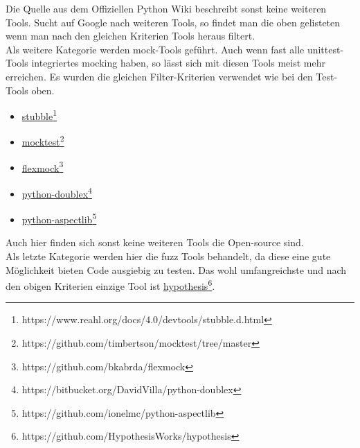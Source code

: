 Die Quelle aus dem Offiziellen Python Wiki beschreibt sonst keine weiteren Tools.
Sucht auf Google nach weiteren Tools, so findet man die oben gelisteten wenn man
nach den gleichen Kriterien Tools heraus filtert.
\newline
\\
Als weitere Kategorie werden \Gls{mock}-Tools geführt. Auch wenn fast alle
unittest-Tools integriertes \gls{mock}ing haben, so lässt sich mit diesen
Tools meist mehr erreichen. Es wurden die gleichen Filter-Kriterien verwendet wie bei den
Test-Tools oben.
\begin{itemize}
    \item \href{https://www.reahl.org/docs/4.0/devtools/stubble.d.html}{stubble}\footnote{https://www.reahl.org/docs/4.0/devtools/stubble.d.html}
    \item \href{https://github.com/timbertson/mocktest/tree/master}{mocktest}\footnote{https://github.com/timbertson/mocktest/tree/master}
    \item \href{https://github.com/bkabrda/flexmock}{flexmock}\footnote{https://github.com/bkabrda/flexmock}
    \item \href{https://bitbucket.org/DavidVilla/python-doublex}{python-doublex}\footnote{https://bitbucket.org/DavidVilla/python-doublex}
    \item \href{https://github.com/ionelmc/python-aspectlib}{python-aspectlib}\footnote{https://github.com/ionelmc/python-aspectlib}
\end{itemize}
Auch hier finden sich sonst keine weiteren Tools die Open-source sind.
\newline
\\
Als letzte Kategorie werden hier die \Gls{fuzz} Tools behandelt, da diese eine
gute Möglichkeit bieten Code ausgiebig zu testen. Das wohl umfangreichste und nach den obigen Kriterien
einzige Tool ist \href{https://github.com/HypothesisWorks/hypothesis}{hypothesis}\footnote{https://github.com/HypothesisWorks/hypothesis}.










%
%
%

